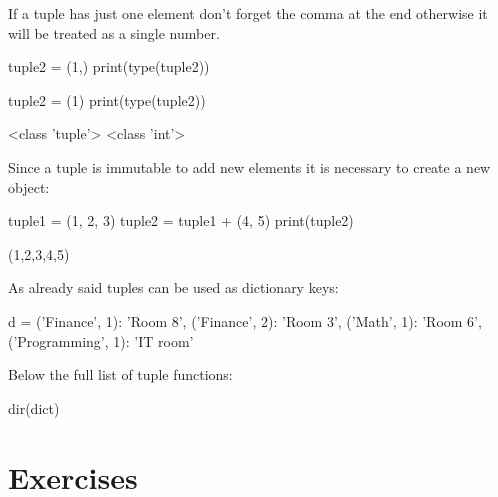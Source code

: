 If a tuple has just one element don't forget the comma at the end otherwise it will be treated as a single number.

\begin{ipython}
tuple2 = (1,)
print(type(tuple2))

tuple2 = (1)
print(type(tuple2))
\end{ipython}
\begin{ioutput}
<class 'tuple'>
<class 'int'>
\end{ioutput}

Since a tuple is immutable to add new elements it is necessary to create a new object:

\begin{ipython}
tuple1 = (1, 2, 3)
tuple2 = tuple1 + (4, 5)
print(tuple2)
\end{ipython}
\begin{ioutput}
(1,2,3,4,5)
\end{ioutput}

As already said tuples can be used as dictionary keys:

\begin{ipython}
d = {
	('Finance', 1): 'Room 8',
	('Finance', 2): 'Room 3',
	('Math', 1): 'Room 6',
	('Programming', 1): 'IT room'}
\end{ipython}

Below the full list of tuple functions:
\begin{ipython}
dir(dict)
\end{ipython}
\begin{ioutput}
\end{ioutput}

\section*{Exercises}


